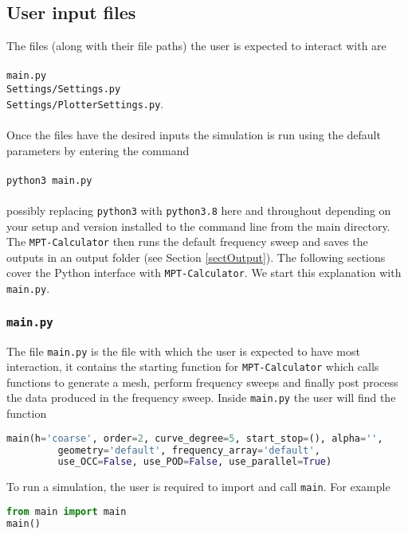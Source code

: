 \subsection{User input files}
The files (along with their file paths) the user is expected to interact with are\\
\\
\texttt{main.py}\\
\texttt{Settings/Settings.py}\\
\texttt{Settings/PlotterSettings.py}.\\
\\
Once the files have the desired inputs the simulation is run using the default parameters by entering the command\\
\\
\texttt{python3 main.py}\\
\\
possibly replacing \texttt{python3} with \texttt{python3.8} here and throughout depending on your setup and version installed to the command line from the main directory. The \texttt{MPT-Calculator} then runs the default frequency sweep and saves the outputs in an output folder (see Section \ref{sectOutput}).
The following sections cover the Python interface with \texttt{MPT-Calculator}. We start this explanation with \texttt{main.py}.

\subsubsection{\texttt{main.py}}\label{sectmain.py}
The file \texttt{main.py} is the file with which the user is expected to have most interaction, it contains the starting function for \texttt{MPT-Calculator} which calls functions to generate a mesh, perform frequency sweeps and finally post process the data produced in the frequency sweep. 
\noindent
Inside \texttt{main.py} the user will find the function

\begin{lstlisting}[language=Python]
main(h='coarse', order=2, curve_degree=5, start_stop=(), alpha='', 
         geometry='default', frequency_array='default', 
         use_OCC=False, use_POD=False, use_parallel=True)
\end{lstlisting}
\noindent
To run a simulation, the user is required to import and call \texttt{main}. For example
\begin{lstlisting}[language=Python]
from main import main
main()
\end{lstlisting} 


